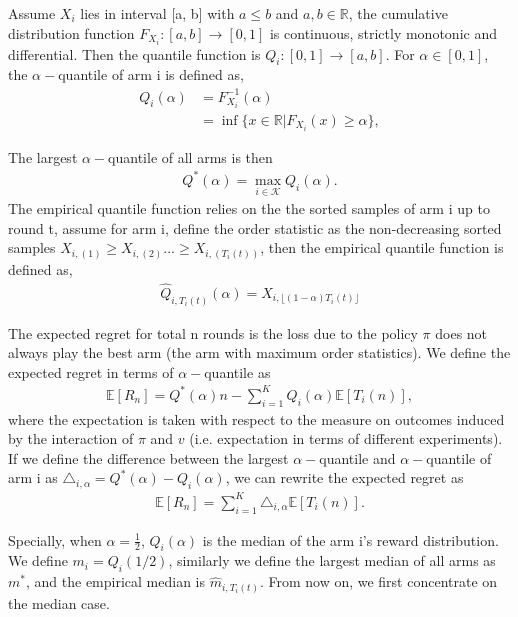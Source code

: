 \documentclass{article}
\theoremstyle{plain}
\begin{document}
    Assume $X_i$ lies in interval [a, b] with $a \leq b$ and $a, b \in \mathbb{R}$, the cumulative distribution function $F_{X_i}: [a, b] \rightarrow [0,1]$ is continuous, strictly monotonic and differential. Then the quantile function is $Q_{i}:  [0,1] \rightarrow [a,b]$. For $\alpha \in [0,1]$, the $\alpha-$quantile of arm i is defined as,
    \begin{align}
        Q_{i}(\alpha) &= F_{X_i}^{-1}(\alpha)\\
        &= \inf \{x \in \mathbb{R}| F_{X_i}(x) \geq \alpha\},
    \end{align}

The largest $\alpha-$quantile of all arms is then
\begin{align}
    Q^\ast(\alpha) = \max_{i\in \mathcal{K}} Q_{i}(\alpha).
\end{align}
The empirical quantile function relies on the the sorted samples of arm i up to round t, assume for arm i, define the order statistic as the non-decreasing sorted samples $X_{i,(1)} \geq X_{i,(2)} ... \geq X_{i,(T_i(t))}$, then the empirical quantile function is defined as,
\begin{align}
    \hat{Q}_{i, T_i(t)}(\alpha) = X_{i,\lfloor (1 - \alpha) T_i(t) \rfloor}
\end{align}


The expected regret for total n rounds is the loss due to the policy $\pi$ does not always play the best arm (the arm with maximum order statistics). We define the expected regret in terms of $\alpha-$quantile as
\begin{align}
    \label{regret}
    \mathbb{E}[R_n] = Q^\ast(\alpha) n -  \sum_{i=1}^K Q_{i}(\alpha) \mathbb{E}[T_i(n)],
\end{align}
where the expectation is taken with respect to the measure on outcomes induced by the interaction of $\pi$ and $v$ (i.e. expectation in terms of different experiments). If we define the difference between the largest $\alpha-$quantile and $\alpha-$quantile of arm i as $\triangle_{i,\alpha} = Q^\ast(\alpha) - Q_{i}(\alpha)$, we can rewrite the expected regret as
\begin{align}
    \label{defi: expected regret}
    \mathbb{E}[R_n] = \sum_{i = 1}^K \triangle_{i, \alpha} \mathbb{E}[T_i(n)].
\end{align}

Specially, when $\alpha = \frac{1}{2}$, $Q_i(\alpha)$ is the median of the arm i's reward distribution. We define $m_i = Q_i(1/2)$, similarly we define the largest median of all arms as $m^*$, and the empirical median is $\hat{m}_{i, T_i(t)}$. From now on, we first concentrate on the median case.
\end{document}

